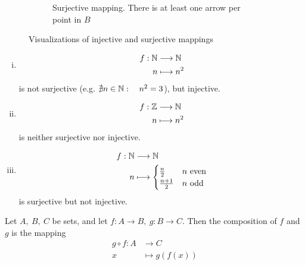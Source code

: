 \documentclass[../../script.tex]{subfiles}
\begin{document}
\begin{defi}
\begin{figure}[ht]
\begin{subfigure}[b]{0.45\textwidth}
		\caption{Surjective mapping. There is at least one arrow per point in $B$}
	\end{subfigure}
	\caption{Visualizations of injective and surjective mappings}
\end{figure}
\end{defi}

\begin{eg}\leavevmode
\begin{enumerate}[(i)]
	\item 
	\begin{align*}
	f: \mathbb{N} &\longrightarrow \mathbb{N} \\
	n &\longmapsto n^2
	\end{align*}
	is not surjective (e.g. $\nexists n \in \mathbb{N}: \quad n^2 = 3$), but injective.
	\item 
	\begin{align*}
	f: \mathbb{Z} &\longrightarrow \mathbb{N} \\
	n &\longmapsto n^2
	\end{align*}
	is neither surjective nor injective.
	\item 
	\begin{align*}
	f: \mathbb{N} &\longrightarrow \mathbb{N} \\
	n &\longmapsto 
	\begin{cases}
		\frac{n}{2} & n \text{ even} \\
		\frac{n+1}{2} & n \text{ odd}
	\end{cases}
	\end{align*}
	is surjective but not injective.
\end{enumerate}
\end{eg}

\begin{defi}
Let $A, ~B, ~C$ be sets, and let $f: A \rightarrow B, ~g: B \rightarrow C$. Then the composition of $f$ and $g$ is the mapping
\begin{align*}
	g \circ f : A &\longrightarrow C \\
	x &\longmapsto g(f(x))
\end{align*}
\end{defi}
\end{document}
